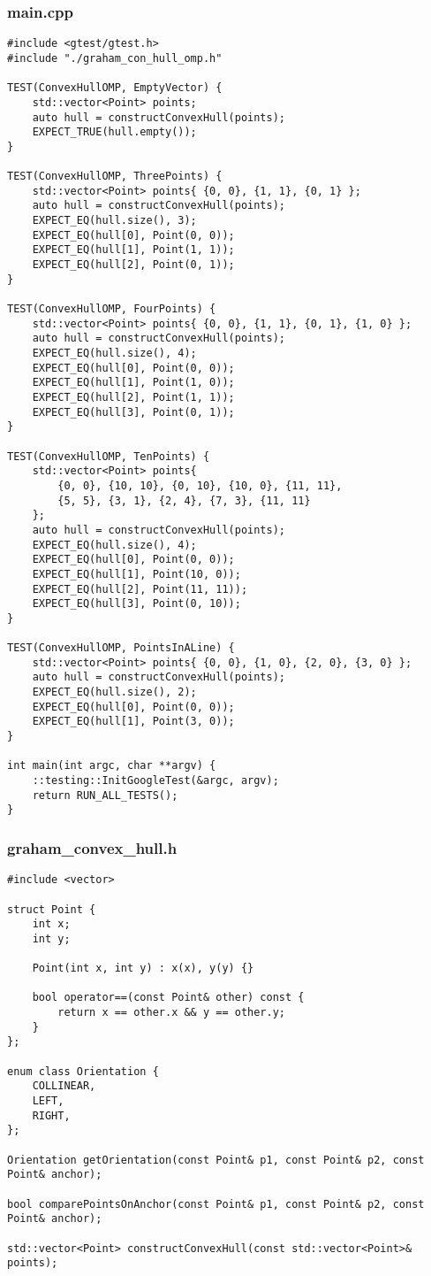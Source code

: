 \documentclass[14pt, a4paper]{extarticle}
\begin{document}
    \subsubsection{main.cpp}
  \begin{lstlisting}
#include <gtest/gtest.h>
#include "./graham_con_hull_omp.h"

TEST(ConvexHullOMP, EmptyVector) {
    std::vector<Point> points;
    auto hull = constructConvexHull(points);
    EXPECT_TRUE(hull.empty());
}

TEST(ConvexHullOMP, ThreePoints) {
    std::vector<Point> points{ {0, 0}, {1, 1}, {0, 1} };
    auto hull = constructConvexHull(points);
    EXPECT_EQ(hull.size(), 3);
    EXPECT_EQ(hull[0], Point(0, 0));
    EXPECT_EQ(hull[1], Point(1, 1));
    EXPECT_EQ(hull[2], Point(0, 1));
}

TEST(ConvexHullOMP, FourPoints) {
    std::vector<Point> points{ {0, 0}, {1, 1}, {0, 1}, {1, 0} };
    auto hull = constructConvexHull(points);
    EXPECT_EQ(hull.size(), 4);
    EXPECT_EQ(hull[0], Point(0, 0));
    EXPECT_EQ(hull[1], Point(1, 0));
    EXPECT_EQ(hull[2], Point(1, 1));
    EXPECT_EQ(hull[3], Point(0, 1));
}

TEST(ConvexHullOMP, TenPoints) {
    std::vector<Point> points{
        {0, 0}, {10, 10}, {0, 10}, {10, 0}, {11, 11},
        {5, 5}, {3, 1}, {2, 4}, {7, 3}, {11, 11}
    };
    auto hull = constructConvexHull(points);
    EXPECT_EQ(hull.size(), 4);
    EXPECT_EQ(hull[0], Point(0, 0));
    EXPECT_EQ(hull[1], Point(10, 0));
    EXPECT_EQ(hull[2], Point(11, 11));
    EXPECT_EQ(hull[3], Point(0, 10));
}

TEST(ConvexHullOMP, PointsInALine) {
    std::vector<Point> points{ {0, 0}, {1, 0}, {2, 0}, {3, 0} };
    auto hull = constructConvexHull(points);
    EXPECT_EQ(hull.size(), 2);
    EXPECT_EQ(hull[0], Point(0, 0));
    EXPECT_EQ(hull[1], Point(3, 0));
}

int main(int argc, char **argv) {
    ::testing::InitGoogleTest(&argc, argv);
    return RUN_ALL_TESTS();
}
  \end{lstlisting}
  \newpage
  \subsubsection{graham\_convex\_hull.h}
  \begin{lstlisting}
#include <vector>

struct Point {
    int x;
    int y;

    Point(int x, int y) : x(x), y(y) {}

    bool operator==(const Point& other) const {
        return x == other.x && y == other.y;
    }
};

enum class Orientation {
    COLLINEAR,
    LEFT,
    RIGHT,
};

Orientation getOrientation(const Point& p1, const Point& p2, const Point& anchor);

bool comparePointsOnAnchor(const Point& p1, const Point& p2, const Point& anchor);

std::vector<Point> constructConvexHull(const std::vector<Point>& points);
  \end{lstlisting}
  \newpage
\end{document}
